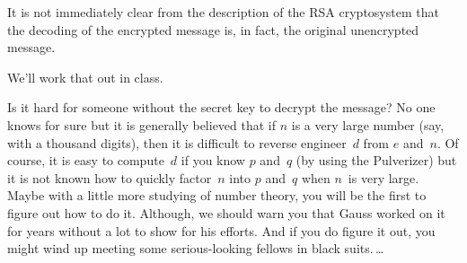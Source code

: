 It is not immediately clear from the description of the RSA
cryptosystem that the decoding of the encrypted message is, in fact,
the original unencrypted message.


We'll work that out in class.



\iffalse
In order to check that this is the
case, we need to show that the decryption
$\rem{(m^*)^d}{n}$ is indeed equal to the sender's message~$m$.  Since
$m^* = \rem{m^e}{n}$, \ $m^*$ is congruent to~$m^e$ modulo~$n$ by
Corollary~\ref{aran}.  That is,
\begin{equation*}
    m^* \equiv m^e \pmod n.
\end{equation*}
By raising both sides to the power~$d$, we obtain the congruence
\begin{equation}\label{eq:RSAx1}
    (m^*)^d \equiv m^{ed} \pmod n.
\end{equation}
The encryption exponent~$e$ and the decryption exponent~$d$ are chosen
such that $de \equiv 1 \pmod{(p - 1)(q - 1)}$.  So, there exists an
integer~$r$ such that $ed = 1 + r(p - 1)(q - 1)$.  By substituting $1
+ r(p - 1)(q - 1)$ for~$ed$ in Equation~\ref{eq:RSAx1}, we obtain
\begin{equation}\label{eq:RSAx2}
    (m^*)^d \equiv m \cdot m^{r(p - 1)(q - 1)} \pmod n.
\end{equation}

By Euler's Theorem and the assumption that $\gcd(m, n) = 1$, we know
that
\begin{equation*}
    m^{\phi(n)} \equiv 1 \pmod n.
\end{equation*}
From Corollary~\ref{cor:H7}, we know that $\phi(n) = (p - 1)(q - 1)$.
Hence,
\begin{align*}
(m^*)^d  &= m \cdot m^{r(p-1)(q-1)} \pmod{n} \\
        &= m \cdot 1^{r} \pmod{n} \\
        &= m \pmod{n}.
\end{align*}
Hence, the decryption process indeed reproduces the original
message~$m$.
\fi


Is it hard for someone without the secret key to decrypt the message?
No one knows for sure but it is generally believed that if $n$ is a
very large number (say, with a thousand digits), then it is difficult
to reverse engineer~$d$ from $e$ and~$n$.  Of course, it is easy to
compute~$d$ if you know $p$ and~$q$ (by using the Pulverizer) but it
is not known how to quickly factor~$n$ into $p$ and~$q$ when $n$~is
very large.  Maybe with a little more studying of number theory, you
will be the first to figure out how to do it.  Although, we should
warn you that Gauss worked on it for years without a lot to show for
his efforts.  And if you do figure it out, you might wind up meeting
some serious-looking fellows in black suits.\,\dots

